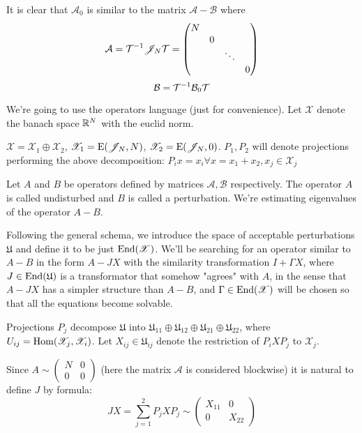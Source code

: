 \documentclass{article}
\begin{document}
It is clear that $\mathcal A_0$ is similar to the matrix $\mathcal A - \mathcal B$ where
$$\mathcal A = {\mathcal T}^{-1}{\mathscr{J}_{N}}{\mathcal T}
= \begin{pmatrix}
    N &   &        & \\
      & 0 &        & \\
      &   & \ddots & \\
      &   &        & 0
\end{pmatrix}$$
$$\mathcal B = {\mathcal T}^{-1}{\mathcal B_0}{\mathcal T}$$


We're going to use the operators language (just for convenience).
Let $\mathscr X$ denote the banach space $\mathbb{R}^N$ with the  euclid norm.

$\mathscr X = \mathscr X_1 \oplus \mathscr X_2$,
$\mathscr X_1 = \mathrm{E}({\mathscr{J}_{N}}, {N})$,
$\mathscr X_2 = \mathrm{E}({\mathscr{J}_{N}}, {0})$.
$P_1, P_2$ will denote projections performing the above decomposition:
$P_i x = x_i \forall x = x_1 + x_2, x_j\in\mathscr X_j$

Let $A$ and $B$ be operators defined by matrices $\mathcal A, \mathcal B$ respectively.
The operator $A$ is called undisturbed and $B$ is called a perturbation.
We're estimating eigenvalues of the operator $A - B$.

Following the general schema, we introduce
the space of acceptable perturbations $\mathfrak U$
and define it to be just $\mathrm{End}({\mathscr X})$.
We'll be searching for an operator similar to $A - B$
in the form $A - JX$ with the similarity transformation $I + \Gamma X$,
where $J\in\mathrm{End}({\mathfrak U})$ is a transformator that somehow "agrees" with $A$,
in the sense that $A - JX$ has a simpler structure than $A - B$,
and $\Gamma\in\mathrm{End}({\mathscr X})$ will be chosen so that all the equations become solvable.

Projections $P_j$ decompose $\mathfrak U$ into
$\mathfrak U_{11} \oplus \mathfrak U_{12} \oplus \mathfrak U_{21} \oplus \mathfrak U_{22}$,
where $U_{ij} = \mathrm{Hom}({\mathscr X_j},{\mathscr X_i})$.
Let $X_{ij} \in \mathfrak U_{ij}$ denote the restriction of $P_i X P_j$ to $\mathscr X_j$.

Since $A \sim \begin{pmatrix} N & 0 \\ 0 & 0 \end{pmatrix}$
(here the matrix $\mathcal A$ is considered blockwise)
it is natural to define $J$ by formula:
$$JX = \sum_{j=1}^2 P_j X P_j \sim \begin{pmatrix} X_{11} & 0 \\ 0 & X_{22} \end{pmatrix}$$
\end{document}

